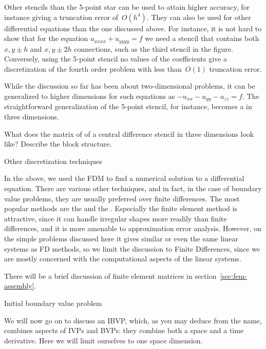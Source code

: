 Other stencils than the 5-point star can be used to attain higher
accuracy, for instance giving a truncation error of~$O(h^4)$. They can
also be used for other differential equations than the one discussed
above. For instance, it is not hard to show that for the equation
$u_{xxxx}+u_{yyyy}=f$ we need a stencil that contains both $x,y\pm h$
and $x,y\pm 2h$ connections, such as the third stencil in the
figure. Conversely, using the 5-point stencil no values of the
coefficients give a discretization of the fourth order problem with
less than~$O(1)$ truncation error.

While the discussion so far has been about two-dimensional
problems, it can be generalized to higher dimensions for such
equations as $-u_{xx}-u_{yy}-u_{zz}=f$. The straightforward
generalization of the 5-point stencil, for instance, becomes a
%
in three dimensions.
\begin{exercise}
  What does the matrix of of a central difference stencil in three dimensions look like?
  Describe the block structure.
\end{exercise}

 {Other discretization techniques}
\label{sec:fem}

In the above, we used the \ac{FDM} to find a numerical solution
to a differential equation. There are various other techniques, and in
fact, in the case of boundary value problems, they are usually
preferred over finite differences. The most popular methods are the
 and the . Especially the finite element method is attractive, since
it can handle irregular shapes more readily than finite differences,
and it is more amenable to
approximation error analysis. However, on the simple problems discussed here
it gives similar or even the same linear systems as \ac{FD} methods,
so we limit the discussion to Finite Differences, since we are mostly
concerned with the computational aspects of the linear systems.

There will be a brief discussion of finite element matrices in
section~\ref{sec:fem-assembly}.


 {Initial boundary value problem}
\label{sec:heateq}

We will now go on to discuss an \acf{IBVP}, which, as you may deduce
from the name, combines aspects of \ac{IVP}s and \ac{BVP}s:
they combine both a space and a time derivative.
Here we will limit ourselves to one space dimension.

